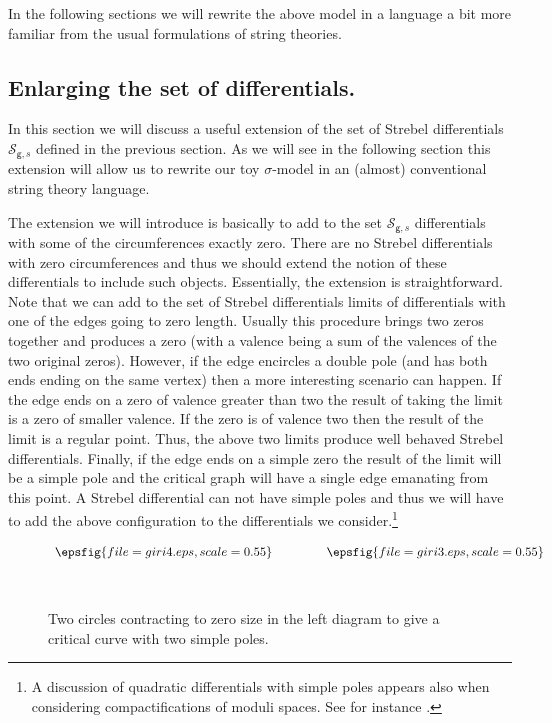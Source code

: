 \documentclass[11pt]{JHEP3}
\def\gg{\mathsf g }
\begin{document}
In the following sections we will rewrite the above model in a language a bit more familiar
from the usual formulations of string theories.

\subsection{Enlarging the set of differentials.}\label{punct}

In this section we will discuss a useful extension of the set of Strebel differentials
${\mathcal S}_{\gg,s}$ defined in the previous section. As we will see in the following
section this extension will allow us to rewrite our toy $\sigma$-model in an (almost)
conventional string theory language.

The extension we will introduce is basically to add to the set
${\mathcal S}_{\gg,s}$  differentials with some of
the circumferences exactly zero.
There are no Strebel differentials with zero circumferences and thus we should extend the notion
of these differentials to include such objects. Essentially, the extension is straightforward. Note
that we can add to the set of Strebel differentials limits of differentials with one of the edges going to zero length. Usually
this procedure brings two zeros together and produces a zero (with a valence being a sum of the valences of the two original zeros). However, if the edge encircles a double pole (and has both ends ending on the same vertex) then a more interesting scenario can happen. If the edge
ends on a zero of valence greater than two the result of taking the limit is a zero of smaller valence. If the zero is of valence two then the result of the limit is a regular point.
Thus, the above two limits produce well behaved Strebel differentials. Finally,
if the edge ends on a simple zero the result of the limit will be a simple pole and
the critical graph will have a single edge emanating from this point. A Strebel differential
can not have simple poles and thus we will have to add the above configuration to the differentials
we consider.\footnote{A discussion of quadratic differentials with simple poles 
appears also when considering compactifications of moduli spaces. See for instance \cite{zvon}. 
}
\begin{figure}[htbp]
 \begin{center}
 $\begin{array}{c@{\hspace{0.6in\vspace{0.3in}}}c}
\epsfig{file=giri4.eps,scale=0.55} &  \epsfig{file=giri3.eps,scale=0.55}
\\ [0.2cm]
\end{array}$
\caption{Two circles contracting to  zero size in the left diagram to give a critical curve  with two simple poles.} \label{PPTrQ2}
\end{center}
\end{figure} 
\end{document}
